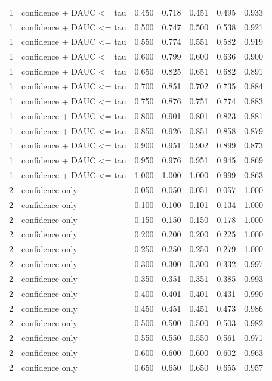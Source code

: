 \begin{tabular}{rlrrrrr}
1 & confidence + DAUC <= tau & 0.450 & 0.718 & 0.451 & 0.495 & 0.933 \\
1 & confidence + DAUC <= tau & 0.500 & 0.747 & 0.500 & 0.538 & 0.921 \\
1 & confidence + DAUC <= tau & 0.550 & 0.774 & 0.551 & 0.582 & 0.919 \\
1 & confidence + DAUC <= tau & 0.600 & 0.799 & 0.600 & 0.636 & 0.900 \\
1 & confidence + DAUC <= tau & 0.650 & 0.825 & 0.651 & 0.682 & 0.891 \\
1 & confidence + DAUC <= tau & 0.700 & 0.851 & 0.702 & 0.735 & 0.884 \\
1 & confidence + DAUC <= tau & 0.750 & 0.876 & 0.751 & 0.774 & 0.883 \\
1 & confidence + DAUC <= tau & 0.800 & 0.901 & 0.801 & 0.823 & 0.881 \\
1 & confidence + DAUC <= tau & 0.850 & 0.926 & 0.851 & 0.858 & 0.879 \\
1 & confidence + DAUC <= tau & 0.900 & 0.951 & 0.902 & 0.899 & 0.873 \\
1 & confidence + DAUC <= tau & 0.950 & 0.976 & 0.951 & 0.945 & 0.869 \\
1 & confidence + DAUC <= tau & 1.000 & 1.000 & 1.000 & 0.999 & 0.863 \\
2 & confidence only & 0.050 & 0.050 & 0.051 & 0.057 & 1.000 \\
2 & confidence only & 0.100 & 0.100 & 0.101 & 0.134 & 1.000 \\
2 & confidence only & 0.150 & 0.150 & 0.150 & 0.178 & 1.000 \\
2 & confidence only & 0.200 & 0.200 & 0.200 & 0.225 & 1.000 \\
2 & confidence only & 0.250 & 0.250 & 0.250 & 0.279 & 1.000 \\
2 & confidence only & 0.300 & 0.300 & 0.300 & 0.332 & 0.997 \\
2 & confidence only & 0.350 & 0.351 & 0.351 & 0.385 & 0.993 \\
2 & confidence only & 0.400 & 0.401 & 0.401 & 0.431 & 0.990 \\
2 & confidence only & 0.450 & 0.451 & 0.451 & 0.473 & 0.986 \\
2 & confidence only & 0.500 & 0.500 & 0.500 & 0.503 & 0.982 \\
2 & confidence only & 0.550 & 0.550 & 0.550 & 0.561 & 0.971 \\
2 & confidence only & 0.600 & 0.600 & 0.600 & 0.602 & 0.963 \\
2 & confidence only & 0.650 & 0.650 & 0.650 & 0.655 & 0.957 \\

\end{tabular}
